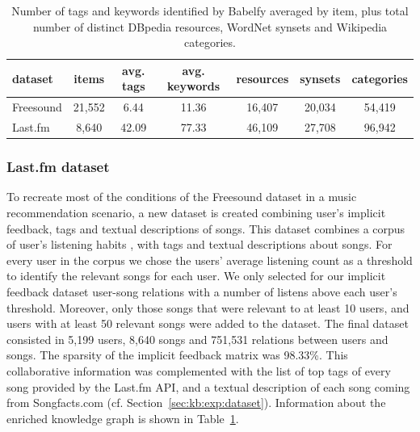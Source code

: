 \begin{table}
\scriptsize
	\label{tbl:graph-rec:datasets}
	\begin{tabular}{l c c c c c c}
		\toprule
		\textbf{dataset} & \textbf{items} & \textbf{avg. tags} & \textbf{avg. keywords} & \textbf{resources} & \textbf{synsets} & \textbf{categories}\\
		\midrule
		Freesound & 21,552 & 6.44 & 11.36 & 16,407 & 20,034 & 54,419 \\
		Last.fm & 8,640 & 42.09 & 77.33 & 46,109 & 27,708 & 96,942 \\
		\bottomrule
		
	\end{tabular}
	\caption[Number of tags and keywords.]{Number of tags and keywords identified by Babelfy averaged by item, plus total number of distinct DBpedia resources, WordNet synsets and Wikipedia categories.
	}
\end{table}


\subsubsection{Last.fm dataset}\label{fs_dataset}
To recreate most of the conditions of the Freesound dataset in a music recommendation scenario, a new dataset is created combining user's implicit feedback, tags and textual descriptions of songs. This dataset combines a corpus of user's listening habits \citep{Vigliensoni2014}, with tags and textual descriptions about songs. For every user in the corpus we chose the users' average listening count as a threshold to identify the relevant songs for each user. We only selected for our implicit feedback dataset user-song relations with a number of listens above each user's threshold. Moreover, only those songs that were relevant to at least 10 users, and users with at least 50 relevant songs were added to the dataset. The final dataset consisted in 5,199 users, 8,640 songs and 751,531 relations between users and songs. The sparsity of the implicit feedback matrix was 98.33\%.
This collaborative information was complemented with the list of top tags of every song provided by the Last.fm API, and a textual description of each song coming from Songfacts.com (cf. Section~\ref{sec:kb:exp:dataset}). Information about the enriched knowledge graph is shown in Table~\ref{tbl:graph-rec:datasets}.


